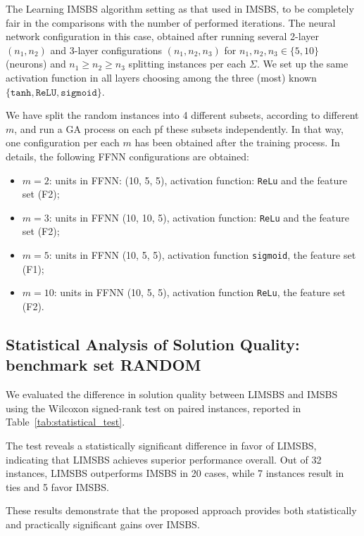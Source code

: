 \documentclass[11pt,a4paper]{article}
\begin{document}
The Learning IMSBS algorithm setting as that used in IMSBS,  to be completely fair in the comparisons with the number of performed iterations. The neural network configuration in this case, obtained after running several 2-layer $(n_1, n_2)$ and 3-layer configurations  $(n_1, n_2, n_3)$ for $n_1, n_2, n_3 \in \{5, 10\}$ (neurons) and $n_1 \geq n_2 \geq n_3$ splitting instances per each $\Sigma$. We set up the same activation function in all layers choosing among the three (most) known $\{\texttt{tanh}, \texttt{ReLU}, \texttt{sigmoid}\}$. 

We have split the random instances into 4 different subsets, according to different $m$, and run a GA process on each pf these subsets independently. 
In that way, one configuration per each $m$ has been obtained after the training process. In details, the following FFNN configurations are obtained:
\begin{itemize}
	\item $m=2$: units in FFNN: (10, 5, 5), activation function: \texttt{ReLu} and the feature set (F2);
	\item $m=3$: units in FFNN (10, 10, 5), activation function: \texttt{ReLu} and the feature set (F2);
	\item $m=5$: units in FFNN (10, 5, 5), activation function \texttt{sigmoid}, the feature set (F1);
	\item $m=10$: units in FFNN (10, 5, 5),  activation function \texttt{ReLu}, the feature set (F2). 
\end{itemize}


\subsection{Statistical Analysis of Solution Quality: benchmark set RANDOM}

 
 We evaluated the difference in solution quality between LIMSBS and IMSBS using the Wilcoxon signed-rank test on paired instances, reported in Table~\ref{tab:statistical_test}. 
 
 The test reveals a statistically significant difference in favor of LIMSBS, indicating that LIMSBS achieves superior performance overall. Out of 32 instances, LIMSBS outperforms IMSBS in 20 cases, while 7 instances result in ties and 5 favor IMSBS.
 
 
These results demonstrate that the proposed approach provides both statistically and practically significant gains over IMSBS.
\end{document}
